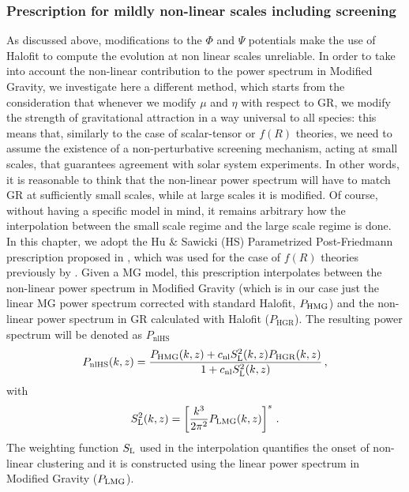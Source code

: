 \subsubsection{Prescription for mildly non-linear scales including screening}
\label{sub:Prescription-HS}

As discussed above, modifications to the $\Phi$ and $\Psi$ 
potentials make the use of Halofit to compute the evolution at non linear scales 
unreliable. In order to
take into account the non-linear contribution to the power spectrum
in Modified Gravity, we investigate here a different method, which
starts from the consideration that whenever we
modify $\mu$ and $\eta$ with respect to GR, we modify the strength
of gravitational attraction in a way universal to all species: this
means that, similarly to the case of scalar-tensor or $f(R)$ theories,
we need to assume the existence of a non-perturbative screening mechanism, acting at
small scales, that guarantees agreement with solar system experiments.
In other words, it is reasonable to think that the non-linear power
spectrum will have to match GR at sufficiently small scales, while
at large scales it is modified. Of course, without having a specific model in mind, it remains arbitrary
how the interpolation between the small scale regime and the large
scale regime is done. In this
chapter, we adopt the Hu \& Sawicki (HS) Parametrized Post-Friedmann prescription proposed
in \cite{hu_parameterized_2007}, which was used for the case of $f(R)$
theories previously by \cite{zhao_modeling_2014}. Given a MG model,
this prescription interpolates between the non-linear power spectrum
in Modified Gravity (which is in our case just the linear MG power
spectrum corrected with standard Halofit, $P_{\mathrm{HMG}}$) and the non-linear
power spectrum in GR calculated with Halofit ($P_{\mathrm{HGR}}$). The resulting
power spectrum will be denoted as $P_{\mathrm{nlHS}}$
\begin{equation}
P_{\mathrm{nlHS}}(k,z)=\frac{P_{\mathrm{HMG}}(k,z)+c_{\mathrm{nl}} S_{\mathrm{L}}^{2}(k,z)P_{\mathrm{HGR}}(k,z)}{1+c_{\mathrm{nl}} S_{\mathrm{L}}^{2}(k,z)} \, ,\label{eq:PHSDefinition}
\end{equation}
with 
\begin{equation}
S_{\mathrm{L}}^{2}(k,z)=\left[\frac{k^{3}}{2\pi^{2}}P_{\mathrm{LMG}}(k,z)\right]^{s} \, . \label{eq:prescription_sigma_def}
\end{equation}
The weighting function $S_{\mathrm{L}}$ used in the interpolation quantifies the onset of non-linear clustering and it is constructed
using the linear power spectrum in Modified Gravity ($P_{\mathrm{LMG}}$).

